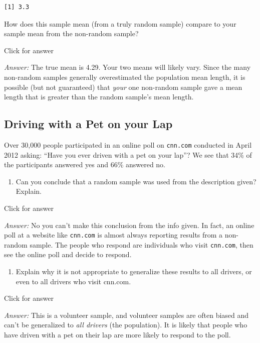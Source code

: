 \documentclass[
]{book}
\providecommand{\tightlist}{%
  \setlength{\itemsep}{0pt}\setlength{\parskip}{0pt}}
\begin{document}
\begin{verbatim}
[1] 3.3
\end{verbatim}

How does this sample mean (from a truly random sample) compare to your sample mean from the non-random sample?

Click for answer

\emph{Answer:} The true mean is 4.29. Your two means will likely vary. Since the many non-random samples generally overestimated the population mean length, it is possible (but not guaranteed) that \emph{your} one non-random sample gave a mean length that is greater than the random sample's mean length.

\hypertarget{driving-with-a-pet-on-your-lap}{%
\subsection{Driving with a Pet on your Lap}\label{driving-with-a-pet-on-your-lap}}

Over 30,000 people participated in an online poll on \texttt{cnn.com} conducted in April 2012 asking: ``Have you ever driven with a pet on your lap''? We see that 34\% of the participants answered yes and 66\% answered no.

\begin{enumerate}
\def\labelenumi{\alph{enumi}.}
\tightlist
\item
  Can you conclude that a random sample was used from the description given? Explain.
\end{enumerate}

Click for answer

\emph{Answer:} No you can't make this conclusion from the info given. In fact, an online poll at a website like \texttt{cnn.com} is almost always reporting results from a non-random sample. The people who respond are individuals who visit \texttt{cnn.com}, then see the online poll and decide to respond.

\begin{enumerate}
\def\labelenumi{\alph{enumi}.}
\setcounter{enumi}{1}
\tightlist
\item
  Explain why it is not appropriate to generalize these results to all drivers, or even to all drivers who visit cnn.com.
\end{enumerate}

Click for answer

\emph{Answer:} This is a volunteer sample, and volunteer samples are often biased and can't be generalized to \emph{all drivers} (the population). It is likely that people who have driven with a pet on their lap are more likely to respond to the poll.
\end{document}
